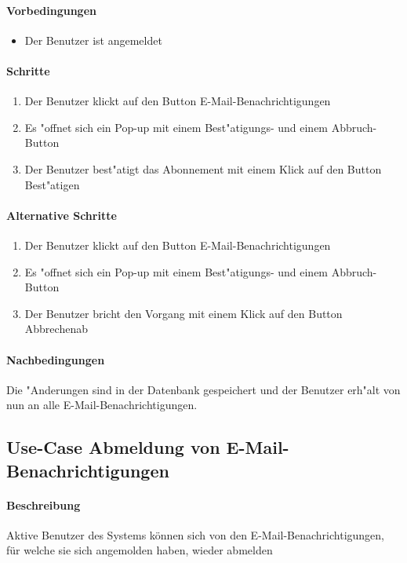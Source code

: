 	\paragraph{Vorbedingungen}
	\begin{itemize}
	 	\item Der Benutzer ist angemeldet
	\end{itemize}
	
	\paragraph{Schritte}
	\begin{enumerate}
	 	\item Der Benutzer klickt auf den Button \dq E-Mail-Benachrichtigungen\dq
		\item Es "offnet sich ein Pop-up mit einem Best"atigungs- und einem Abbruch-Button
	 	\item Der Benutzer best"atigt das Abonnement mit einem Klick auf den Button \dq Best"atigen\dq
	\end{enumerate}
	
	\paragraph{Alternative Schritte}
	\begin{enumerate}
		\item Der Benutzer klickt auf den Button \dq E-Mail-Benachrichtigungen\dq
		\item Es "offnet sich ein Pop-up mit einem Best"atigungs- und einem Abbruch-Button
		\item Der Benutzer bricht den Vorgang mit einem Klick auf den Button \dq Abbrechen\dq ab
	\end{enumerate}
	\paragraph{Nachbedingungen}
	Die "Anderungen sind in der Datenbank gespeichert und der Benutzer erh"alt von nun an alle E-Mail-Benachrichtigungen. 
	
	
	
	
	\newpage
	\subsection{Use-Case Abmeldung von E-Mail-Benachrichtigungen}
	\paragraph{Beschreibung}
	Aktive Benutzer des Systems können sich von den E-Mail-Benachrichtigungen, für welche sie sich angemolden haben, wieder abmelden 
